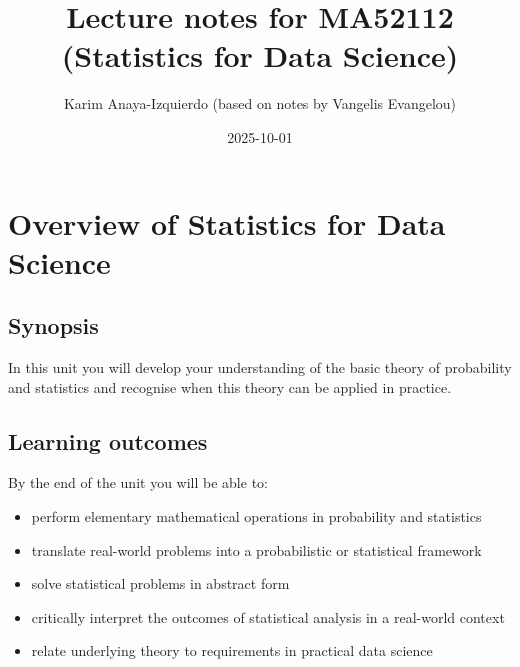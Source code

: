 \documentclass[
  letterpaper,
]{scrbook}
\title{Lecture notes for MA52112 (Statistics for Data Science)}
\author{Karim Anaya-Izquierdo (based on notes by Vangelis Evangelou)}
\date{2025-10-01}
\renewcommand*\contentsname{Table of contents}
\newcommand\contentsname{Table of contents}
\theoremstyle{definition}
\theoremstyle{plain}
\theoremstyle{plain}
\theoremstyle{definition}
\theoremstyle{remark}
\begin{document}
\frontmatter
\maketitle

\renewcommand*\contentsname{Table of contents}
{
\hypersetup{linkcolor=}
\setcounter{tocdepth}{2}
\tableofcontents
}

\mainmatter
{}

\chapter*{Overview of Statistics for Data
Science}\label{overview-of-statistics-for-data-science}


\section*{Synopsis}\label{synopsis}


In this unit you will develop your understanding of the basic theory of
probability and statistics and recognise when this theory can be applied
in practice.

\section*{Learning outcomes}\label{learning-outcomes}


By the end of the unit you will be able to:

\begin{itemize}
\item
  perform elementary mathematical operations in probability and
  statistics
\item
  translate real-world problems into a probabilistic or statistical
  framework
\item
  solve statistical problems in abstract form
\item
  critically interpret the outcomes of statistical analysis in a
  real-world context
\item
  relate underlying theory to requirements in practical data science
\end{itemize}
\end{document}
